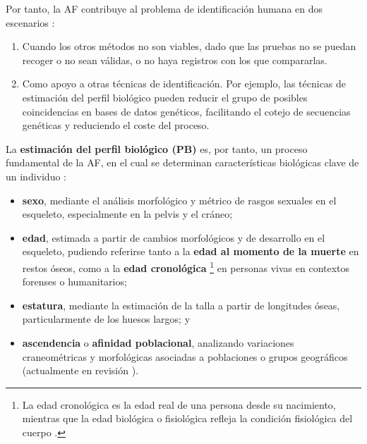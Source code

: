 Por tanto, la \acrshort{AF} contribuye al problema de identificación humana en dos escenarios \cite{swganth2010}:  

\begin{enumerate}

    \item Cuando los otros métodos no son viables, dado que las pruebas no se puedan recoger o no sean válidas, o no haya registros con los que compararlas.
    
    \item Como apoyo a otras técnicas de identificación. Por ejemplo, las técnicas de estimación del perfil biológico pueden reducir el grupo de posibles coincidencias en bases de datos genéticos, facilitando el cotejo de secuencias genéticas y reduciendo el coste del proceso.  

\end{enumerate}

La \textbf{estimación del perfil biológico (\acrshort{PB})} es, por tanto, un proceso fundamental de la \acrshort{AF}, en el cual se determinan características biológicas clave de un individuo \cite{byers2023}: 

\begin{itemize}

    \item \textbf{sexo}, mediante el análisis morfológico y métrico de rasgos sexuales en el esqueleto, 
    especialmente en la pelvis y el cráneo;
    
    \item \textbf{edad}, estimada a partir de cambios morfológicos y de desarrollo en el esqueleto, pudiendo referirse tanto a la \textbf{edad al momento de la muerte} en restos óseos, como a la \textbf{edad cronológica}%
    \footnote{
        La edad cronológica es la edad real de una persona desde su nacimiento, mientras que la edad biológica o fisiológica refleja la condición fisiológica del cuerpo \cite{marcante2025}.
    }
    en personas vivas en contextos forenses o humanitarios;
    
    \item \textbf{estatura}, mediante la estimación de la talla a partir de longitudes óseas, particularmente de los huesos largos; y
    
    \item \textbf{ascendencia} o \textbf{afinidad poblacional}, analizando variaciones craneométricas y morfológicas asociadas a poblaciones o grupos geográficos (actualmente en revisión \cite{ross2021a, ross2021b, flouri2022}).

\end{itemize}

